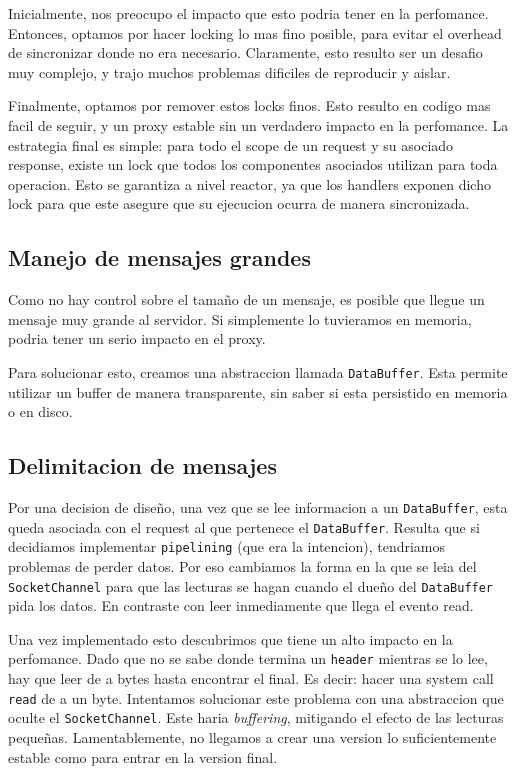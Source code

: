 \documentclass[11pt,a4paper,titlepage]{article}
\begin{document}
    Inicialmente, nos preocupo el impacto que esto podria tener en la perfomance.
    Entonces, optamos por hacer locking lo mas fino posible, para evitar el overhead de sincronizar donde no era necesario.
    Claramente, esto resulto ser un desafio muy complejo, y trajo muchos problemas dificiles de reproducir y aislar.

    Finalmente, optamos por remover estos locks finos.
    Esto resulto en codigo mas facil de seguir, y un proxy estable sin un verdadero impacto en la perfomance.
    La estrategia final es simple: para todo el scope de un request y su asociado response, existe un lock que todos los componentes asociados utilizan para toda operacion.
    Esto se garantiza a nivel reactor, ya que los handlers exponen dicho lock para que este asegure que su ejecucion ocurra de manera sincronizada.

    \subsection{Manejo de mensajes grandes}

    Como no hay control sobre el tamaño de un mensaje, es posible que llegue un mensaje muy grande al servidor.
    Si simplemente lo tuvieramos en memoria, podria tener un serio impacto en el proxy.

    Para solucionar esto, creamos una abstraccion llamada \texttt{DataBuffer}.
    Esta permite utilizar un buffer de manera transparente, sin saber si esta persistido en memoria o en disco.

    \subsection{Delimitacion de mensajes}

    Por una decision de diseño, una vez que se lee informacion a un \texttt{DataBuffer}, esta queda asociada con el request al que pertenece el \texttt{DataBuffer}.
    Resulta que si decidiamos implementar \texttt{pipelining} (que era la intencion), tendriamos problemas de perder datos.
    Por eso cambiamos la forma en la que se leia del \texttt{SocketChannel} para que las lecturas se hagan cuando el dueño del \texttt{DataBuffer} pida los datos.
    En contraste con leer inmediamente que llega el evento read.
    
    Una vez implementado esto descubrimos que tiene un alto impacto en la perfomance.
    Dado que no se sabe donde termina un \texttt{header} mientras se lo lee, hay que leer de a bytes hasta encontrar el final.
    Es decir: hacer una system call \texttt{read} de a un byte.
    Intentamos solucionar este problema con una abstraccion que oculte el \texttt{SocketChannel}.
    Este haria \textit{buffering}, mitigando el efecto de las lecturas pequeñas.
    Lamentablemente, no llegamos a crear una version lo suficientemente estable como para entrar en la version final.
\end{document}
